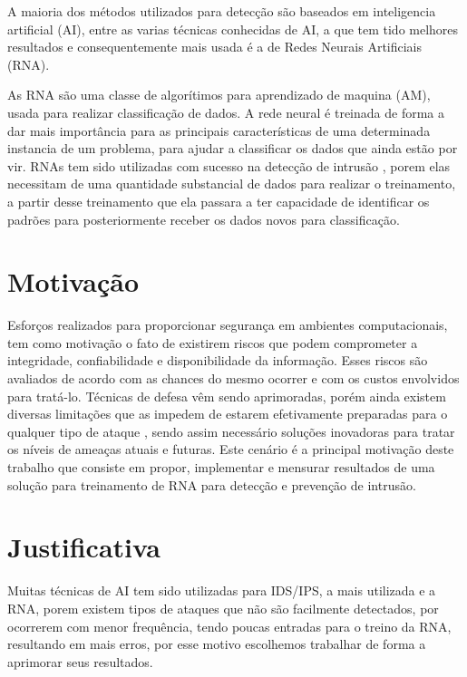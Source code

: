\documentclass[
	12pt,				%
	openright,			%
	oneside,
	a4paper,			%
	english,			%
	french,				%
	spanish,			%
	brazil				%
	]{abntex2}
\begin{document}
A maioria dos métodos utilizados para detecção são baseados em inteligencia artificial (AI), entre as varias técnicas conhecidas de AI, a que tem tido melhores resultados e consequentemente mais usada é a de Redes Neurais Artificiais (RNA)\cite{Jake-Ryan}\cite{Stampar}.

As RNA são uma classe de algorítimos para aprendizado de maquina (AM), usada para realizar classificação de dados. A rede neural é treinada de forma a dar mais importância para as principais características de uma determinada instancia de um problema, para ajudar a classificar os dados que ainda estão por vir. 
RNAs tem sido utilizadas com sucesso na detecção de intrusão \cite{Zhang} \cite{Tong} \cite{Wonil}, porem elas necessitam de uma quantidade substancial de dados para realizar o treinamento, a partir desse treinamento que ela passara a ter capacidade de identificar os padrões para posteriormente receber os dados novos para classificação.


\section{Motivação}

Esforços realizados para proporcionar segurança em ambientes computacionais, tem como motivação o fato de existirem riscos que podem comprometer a integridade, confiabilidade e disponibilidade da informação. 
Esses riscos são avaliados de acordo com as chances do mesmo ocorrer e com os custos envolvidos para tratá-lo. Técnicas de defesa vêm sendo aprimoradas, porém ainda existem diversas limitações que as impedem de estarem efetivamente preparadas para o qualquer tipo de ataque \cite{CeC}, sendo assim necessário  soluções inovadoras para tratar os níveis de ameaças atuais e futuras. 
Este cenário é a principal motivação deste trabalho que consiste em propor, implementar e mensurar resultados de uma solução para treinamento de RNA para detecção e prevenção de intrusão.

\section{Justificativa}

Muitas técnicas de AI tem sido utilizadas para IDS/IPS, a mais utilizada e a RNA\cite{Stampar}, porem existem tipos de ataques que não são facilmente detectados, por ocorrerem com menor frequência, tendo poucas entradas para o treino da RNA\cite{CeC}, resultando em mais erros,  por esse motivo escolhemos trabalhar de forma a aprimorar seus resultados. 
\end{document}
